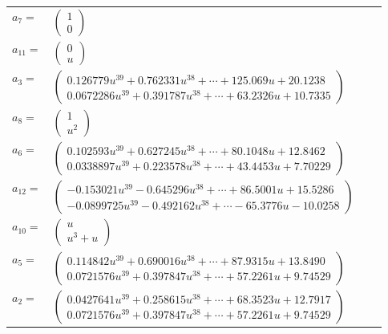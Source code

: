 \documentclass[1p]{elsarticle_modified}
\theoremstyle{definition}
\begin{document}
\begin{tabular}{m{7pt} m{180pt} m{7pt} m{180pt} }
\flushright $a_{7}=$&$\begin{pmatrix}1\\0\end{pmatrix}$ \\
\flushright $a_{11}=$&$\begin{pmatrix}0\\u\end{pmatrix}$ \\
\flushright $a_{3}=$&$\begin{pmatrix}0.126779 u^{39}+0.762331 u^{38}+\cdots+125.069 u+20.1238\\0.0672286 u^{39}+0.391787 u^{38}+\cdots+63.2326 u+10.7335\end{pmatrix}$ \\
\flushright $a_{8}=$&$\begin{pmatrix}1\\u^2\end{pmatrix}$ \\
\flushright $a_{6}=$&$\begin{pmatrix}0.102593 u^{39}+0.627245 u^{38}+\cdots+80.1048 u+12.8462\\0.0338897 u^{39}+0.223578 u^{38}+\cdots+43.4453 u+7.70229\end{pmatrix}$ \\
\flushright $a_{12}=$&$\begin{pmatrix}-0.153021 u^{39}-0.645296 u^{38}+\cdots+86.5001 u+15.5286\\-0.0899725 u^{39}-0.492162 u^{38}+\cdots-65.3776 u-10.0258\end{pmatrix}$ \\
\flushright $a_{10}=$&$\begin{pmatrix}u\\u^3+u\end{pmatrix}$ \\
\flushright $a_{5}=$&$\begin{pmatrix}0.114842 u^{39}+0.690016 u^{38}+\cdots+87.9315 u+13.8490\\0.0721576 u^{39}+0.397847 u^{38}+\cdots+57.2261 u+9.74529\end{pmatrix}$ \\
\flushright $a_{2}=$&$\begin{pmatrix}0.0427641 u^{39}+0.258615 u^{38}+\cdots+68.3523 u+12.7917\\0.0721576 u^{39}+0.397847 u^{38}+\cdots+57.2261 u+9.74529\end{pmatrix}$ \\

\end{tabular}
\end{document}
